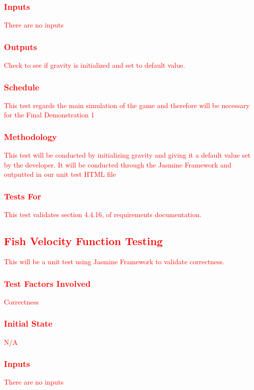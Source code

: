 \documentclass[11pt, oneside]{article}   	%
\begin{document}
\subsubsection{\textcolor{red}{Inputs}}
\textcolor{red}{There are no inputs}
\subsubsection{\textcolor{red}{Outputs}}
\textcolor{red}{Check to see if gravity is initialized and set to default value.}
\subsubsection{\textcolor{red}{Schedule}}
\textcolor{red}{This test regards the main simulation of the game and therefore will be necessary for the Final Demonstration 1}
\subsubsection{\textcolor{red}{Methodology}}
\textcolor{red}{This test will be conducted by initializing gravity and giving it a default value set by the developer. It will be conducted through the Jasmine Framework and outputted in our unit test HTML file}
\subsubsection{\textcolor{red}{Tests For}}
\textcolor{red}{This test validates section 4.4.16, of requirements documentation.}



\subsection{\textcolor{red}{Fish Velocity Function Testing}}
\textcolor{red}{This will be a unit test using Jasmine Framework to validate correctness.}
\subsubsection{\textcolor{red}{Test Factors Involved}}
\textcolor{red}{Correctness}
\subsubsection{\textcolor{red}{Initial State}}
\textcolor{red}{N/A}
\subsubsection{\textcolor{red}{Inputs}}
\textcolor{red}{There are no inputs}
\end{document}
